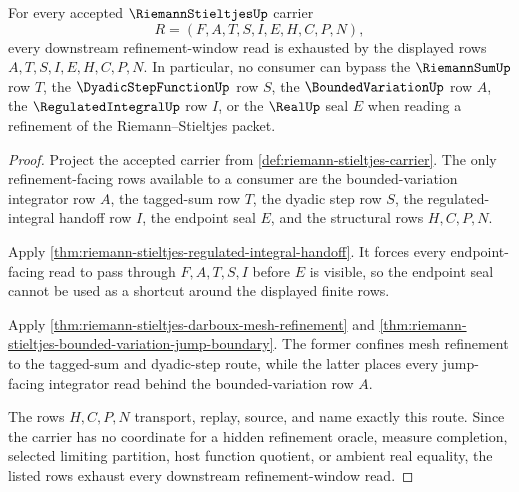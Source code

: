 \begin{theorem}
\label{thm:riemann-stieltjes-refinement-window-exhaustion}
For every accepted $\RiemannStieltjesUp$ carrier
$$
R=(F,A,T,S,I,E,H,C,P,N),
$$
every downstream refinement-window read is exhausted by the displayed rows $A,T,S,I,E,H,C,P,N$. In particular, no consumer can bypass the $\RiemannSumUp$ row $T$, the $\DyadicStepFunctionUp$ row $S$, the $\BoundedVariationUp$ row $A$, the $\RegulatedIntegralUp$ row $I$, or the $\RealUp$ seal $E$ when reading a refinement of the Riemann--Stieltjes packet.
\end{theorem}
\begin{proof}
Project the accepted carrier from \autoref{def:riemann-stieltjes-carrier}. The only refinement-facing rows available to a consumer are the bounded-variation integrator row $A$, the tagged-sum row $T$, the dyadic step row $S$, the regulated-integral handoff row $I$, the endpoint seal $E$, and the structural rows $H,C,P,N$.

Apply \autoref{thm:riemann-stieltjes-regulated-integral-handoff}. It forces every endpoint-facing read to pass through $F,A,T,S,I$ before $E$ is visible, so the endpoint seal cannot be used as a shortcut around the displayed finite rows.

Apply \autoref{thm:riemann-stieltjes-darboux-mesh-refinement} and \autoref{thm:riemann-stieltjes-bounded-variation-jump-boundary}. The former confines mesh refinement to the tagged-sum and dyadic-step route, while the latter places every jump-facing integrator read behind the bounded-variation row $A$.

The rows $H,C,P,N$ transport, replay, source, and name exactly this route. Since the carrier has no coordinate for a hidden refinement oracle, measure completion, selected limiting partition, host function quotient, or ambient real equality, the listed rows exhaust every downstream refinement-window read.
\end{proof}

